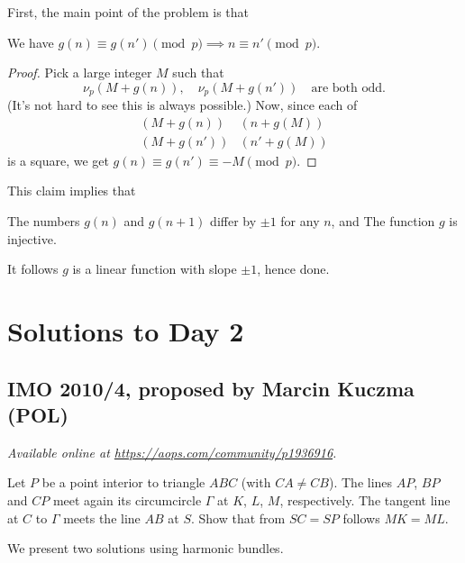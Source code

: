 \documentclass[11pt]{scrartcl}
\begin{document}
First, the main point of the problem is that
\begin{claim*}
  We have
  $g(n) \equiv g(n') \pmod p \implies n \equiv n' \pmod p$.
\end{claim*}
\begin{proof}
  Pick a large integer $M$ such that
  \[ \nu_p(M+g(n)), \quad \nu_p(M+g(n')) \quad
    \text{are both odd}. \]
  (It's not hard to see this is always possible.)
  Now, since each of
  \begin{align*}
    \left( M + g(n) \right)&\left( n + g(M)  \right) \\
    \left( M + g(n') \right)&\left( n' + g(M)  \right)
  \end{align*}
  is a square, we get $g(n) \equiv g(n') \equiv -M \pmod p$.
\end{proof}

This claim implies that
\begin{itemize}
  \ii The numbers $g(n)$ and $g(n+1)$ differ by $\pm 1$ for any $n$, and
  \ii The function $g$ is injective.
\end{itemize}
It follows $g$ is a linear function with slope $\pm 1$, hence done.
\pagebreak

\section{Solutions to Day 2}
\subsection{IMO 2010/4, proposed by Marcin Kuczma (POL)}
\textsl{Available online at \url{https://aops.com/community/p1936916}.}
\begin{mdframed}[style=mdpurplebox,frametitle={Problem statement}]
Let $P$ be a point interior to triangle $ABC$ (with $CA \neq CB$).
The lines $AP$, $BP$ and $CP$ meet again its circumcircle $\Gamma$
at $K$, $L$, $M$, respectively.
The tangent line at $C$ to $\Gamma$ meets the line $AB$ at $S$.
Show that from $SC = SP$ follows $MK = ML$.
\end{mdframed}
We present two solutions using harmonic bundles.
\end{document}

